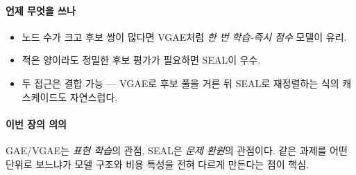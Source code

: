 \documentclass[11pt,a4paper]{article}
\begin{document}
\paragraph{언제 무엇을 쓰나}
\begin{itemize}[leftmargin=*]
  \item 노드 수가 크고 후보 쌍이 많다면 VGAE처럼 \emph{한 번 학습-즉시 점수} 모델이 유리.
  \item 적은 양이라도 정밀한 후보 평가가 필요하면 SEAL이 우수.
  \item 두 접근은 결합 가능 — VGAE로 후보 풀을 거른 뒤 SEAL로 재정렬하는 식의 캐스케이드도 자연스럽다.
\end{itemize}

\paragraph{이번 장의 의의}
GAE/VGAE는 \emph{표현 학습}의 관점, SEAL은 \emph{문제 환원}의 관점이다.
같은 과제를 어떤 단위로 보느냐가 모델 구조와 비용 특성을 전혀 다르게 만든다는 점이 핵심.
\end{document}
